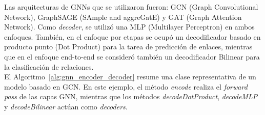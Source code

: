 Las arquitecturas de GNNs que se utilizaron fueron: GCN (Graph Convolutional Network), GraphSAGE (SAmple and aggreGatE) y GAT (Graph Attention Network). Como \textit{decoder}, se utilizó una MLP (Multilayer Perceptron) en ambos enfoques. También, en el enfoque por etapas se ocupó un decodificador basado en producto punto (Dot Product) para la tarea de predicción de enlaces, mientras que en el enfoque end-to-end se consideró también un decodificador Bilinear para la clasificación de relaciones.\\ 




El Algoritmo~\ref{alg:gnn_encoder_decoder} resume una clase representativa de un modelo basado en GCN. En este ejemplo, el método \textit{encode} realiza el \textit{forward pass} de las capas GNN, mientras que los métodos \textit{decodeDotProduct}, \textit{decodeMLP} y \textit{decodeBilinear} actúan como \textit{decoders}.\\

    



    
        

